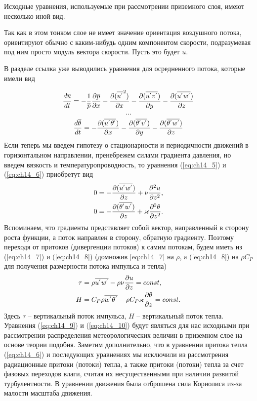 Исходные уравнения, используемые при рассмотрении приземного слоя, имеют несколько иной вид. 

Так как в этом тонком слое не имеет значение ориентация воздушного потока, ориентируют обычно с каким-нибудь одним компонентом скорости, подразумевая под ним просто модуль вектора скорости. Пусть это будет $u$.

В разделе {\color{red}ссылка} уже выводились уравнения для осредненного потока, которые имели вид

 \begin{equation}
 \label{eq:ch14_5} 
     \displaystyle\frac{d \overline{u}}{d t}=-\frac{1}{ \overline{p} }\displaystyle\frac{\partial \overline{p}}{\partial x} 
        -\displaystyle\frac{\partial (\overline{u^{'}}^{2})}{\partial x} 
        -\displaystyle\frac{\partial (\overline{u^{'}v^{'}})}{\partial y} 
        -\displaystyle\frac{\partial  (\overline{u^{'}w^{'}})}{\partial z}  
\end{equation}
\begin{equation*}
         ... 
\end{equation*}
 \begin{equation}
 \label{eq:ch14_6}
         \displaystyle\frac{d \overline{\theta}}{d t}= 
        -\displaystyle\frac{\partial (\overline{u^{'}\theta^{'}})}{\partial x} 
        -\displaystyle\frac{\partial (\overline{\theta^{'}v^{'}})}{\partial y} 
        -\displaystyle\frac{\partial  (\overline{\theta^{'}w^{'}})}{\partial z}  
  \end{equation}
Если теперь мы введем гипотезу о стационарности и периодичности движений в горизонтальном направлении, пренебрежем силами градиента давления, но введем вязкость и температуропроводность, то уравнения (\ref{eq:ch14_5}) и (\ref{eq:ch14_6}) приобретут вид
\begin{align}
    0&=-\displaystyle\frac{\partial (\overline{u^{'}w^{'}})}{\partial z} + \nu \displaystyle\frac{\partial ^2 u}{\partial z^2}, \label{eq:ch14_7} \\
    0&=-\displaystyle\frac{\partial  (\overline{\theta^{'}w^{'}})}{\partial z} + \varkappa \displaystyle\frac{\partial ^2 \theta}{\partial z^2}.  \label{eq:ch14_8}
\end{align}
Вспоминаем, что градиенты представляет собой вектор, направленный в сторону роста функции, а поток направлен в сторону, обратную градиенту. Поэтому переходя от притоков (дивергенции потоков) к самим потокам, будем иметь из (\ref{eq:ch14_7})  и (\ref{eq:ch14_8}) (домножив \ref{eq:ch14_7} на $\rho$, а (\ref{eq:ch14_8}) на $\rho C_P$ для получения размерности потока импульса и тепла)
\begin{align}
    \tau &= \rho \overline{u^{'}w^{'}} - \rho \nu \displaystyle\frac{\partial u}{\partial z} = const, \label{eq:ch14_9} \\
    H &= C_P \rho \overline{w^{'} \theta^{'}} - \rho C_P \varkappa \displaystyle\frac{\partial \theta}{\partial z} = const. \label{eq:ch14_10}
\end{align}
Здесь $\tau$ -- вертикальный поток импульса, $H$ -- вертикальный поток тепла. Уравнения (\ref{eq:ch14_9}) и (\ref{eq:ch14_10}) будут являться для нас исходными при рассмотрении распределения метеорологических величин в приземном слое на основе теории подобия. Заметим дополнительно, что в уравнении притока тепла (\ref{eq:ch14_6}) и последующих уравнениях мы исключили из рассмотрения радиационные притоки (потоки) тепла, а также притоки (потоки) тепла за счет фазовых переходов влаги, считая их несущественными при наличии развитой турбулентности. В уравнении движения была отброшена сила Кориолиса из-за малости масштаба движения. 


